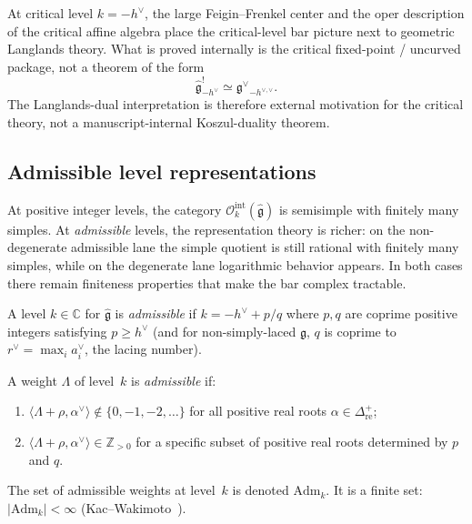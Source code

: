 \begin{remark}
At critical level $k = -h^\vee$, the large Feigin--Frenkel center and
the oper description of the critical affine algebra place the
critical-level bar picture next to geometric Langlands theory.
What is proved internally is the critical fixed-point / uncurved
package, not a theorem of the form
\[
\widehat{\mathfrak{g}}_{-h^\vee}^! \simeq
\widehat{\mathfrak{g}^\vee}_{-h^{\vee,\vee}}.
\]
The Langlands-dual interpretation is therefore external motivation for
the critical theory, not a manuscript-internal Koszul-duality theorem.
\end{remark}

\subsection{Admissible level representations}
\label{sec:admissible-level-reps}

At positive integer levels, the category
$\mathcal{O}_k^{\mathrm{int}}(\widehat{\mathfrak{g}})$ is
semisimple with finitely many simples. At \emph{admissible}
levels, the representation theory is richer: on the
non-degenerate admissible lane the simple quotient is still
rational with finitely many simples, while on the degenerate lane
logarithmic behavior appears. In both cases there remain
finiteness properties that make the bar complex tractable.

\begin{definition}
\label{def:admissible-level}
A level $k \in \mathbb{C}$ for $\widehat{\mathfrak{g}}$ is
\emph{admissible} if $k = -h^\vee + p/q$ where $p, q$ are
coprime positive integers satisfying $p \geq h^\vee$ (and for
non-simply-laced $\mathfrak{g}$, $q$ is coprime to
$r^\vee = \max_i a_i^\vee$, the lacing number).

A weight $\Lambda$ of level~$k$ is \emph{admissible} if:
\begin{enumerate}[label=\textup{(\roman*)}]
\item $\langle \Lambda + \rho, \alpha^\vee \rangle \notin
 \{0, -1, -2, \ldots\}$ for all positive real roots
 $\alpha \in \Delta^+_{\mathrm{re}}$;
\item $\langle \Lambda + \rho, \alpha^\vee \rangle \in
 \mathbb{Z}_{> 0}$ for a specific subset of positive real roots
 determined by $p$ and $q$.
\end{enumerate}
The set of admissible weights at level~$k$ is denoted $\mathrm{Adm}_k$.
It is a finite set: $|\mathrm{Adm}_k| < \infty$
(Kac--Wakimoto~\cite{KW88}).
\end{definition}

